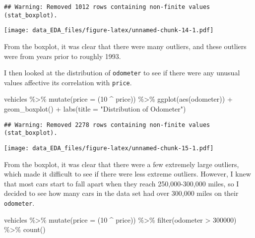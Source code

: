 \documentclass[
]{article}
\newenvironment{Shaded}{\begin{snugshade}}{\end{snugshade}}
\newcommand{\AttributeTok}[1]{\textcolor[rgb]{0.77,0.63,0.00}{#1}}
\newcommand{\DecValTok}[1]{\textcolor[rgb]{0.00,0.00,0.81}{#1}}
\newcommand{\FunctionTok}[1]{\textcolor[rgb]{0.00,0.00,0.00}{#1}}
\newcommand{\NormalTok}[1]{#1}
\newcommand{\SpecialCharTok}[1]{\textcolor[rgb]{0.00,0.00,0.00}{#1}}
\newcommand{\StringTok}[1]{\textcolor[rgb]{0.31,0.60,0.02}{#1}}
\begin{document}
\begin{verbatim}
## Warning: Removed 1012 rows containing non-finite values (stat_boxplot).
\end{verbatim}

\texttt{[image: data\_EDA\_files/figure-latex/unnamed-chunk-14-1.pdf]}

From the boxplot, it was clear that there were many outliers, and these
outliers were from years prior to roughly 1993.

I then looked at the distribution of \texttt{odometer} to see if there
were any unusual values affective its correlation with \texttt{price}.

\begin{Shaded}
\begin{Highlighting}[]
\NormalTok{vehicles }\SpecialCharTok{\%\textgreater{}\%} 
  \FunctionTok{mutate}\NormalTok{(}\AttributeTok{price =}\NormalTok{ (}\DecValTok{10} \SpecialCharTok{\^{}}\NormalTok{ price)) }\SpecialCharTok{\%\textgreater{}\%} 
  \FunctionTok{ggplot}\NormalTok{(}\FunctionTok{aes}\NormalTok{(odometer)) }\SpecialCharTok{+} 
  \FunctionTok{geom\_boxplot}\NormalTok{() }\SpecialCharTok{+} 
  \FunctionTok{labs}\NormalTok{(}\AttributeTok{title =} \StringTok{"Distribution of Odometer"}\NormalTok{)}
\end{Highlighting}
\end{Shaded}

\begin{verbatim}
## Warning: Removed 2278 rows containing non-finite values (stat_boxplot).
\end{verbatim}

\texttt{[image: data\_EDA\_files/figure-latex/unnamed-chunk-15-1.pdf]}

From the boxplot, it was clear that there were a few extremely large
outliers, which made it difficult to see if there were less extreme
outliers. However, I knew that most cars start to fall apart when they
reach 250,000-300,000 miles, so I decided to see how many cars in the
data set had over 300,000 miles on their \texttt{odometer}.

\begin{Shaded}
\begin{Highlighting}[]
\NormalTok{vehicles }\SpecialCharTok{\%\textgreater{}\%} 
  \FunctionTok{mutate}\NormalTok{(}\AttributeTok{price =}\NormalTok{ (}\DecValTok{10} \SpecialCharTok{\^{}}\NormalTok{ price)) }\SpecialCharTok{\%\textgreater{}\%} 
  \FunctionTok{filter}\NormalTok{(odometer }\SpecialCharTok{\textgreater{}} \DecValTok{300000}\NormalTok{) }\SpecialCharTok{\%\textgreater{}\%} 
  \FunctionTok{count}\NormalTok{()}
\end{Highlighting}
\end{Shaded}
\end{document}
